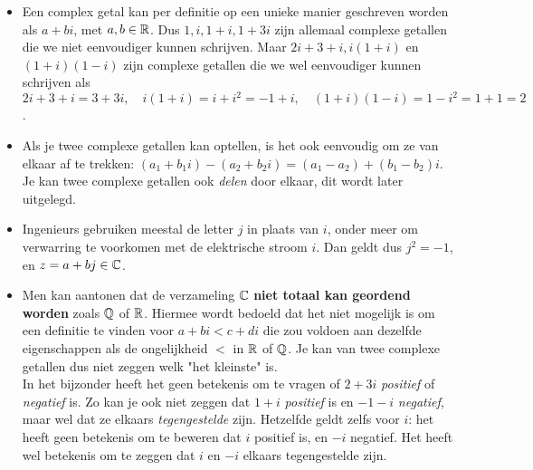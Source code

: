 \documentclass{ximera}
\begin{document}
	\author{Zomercursus KU Leuven}

    
    \begin{remark} \nl
    \begin{itemize}
        \item Een complex getal kan per definitie op een unieke manier geschreven worden als $a+bi$, met $a,b\in\mathbb{R}$. Dus $1, i, 1+i, 1+3i$ zijn allemaal complexe getallen die we niet eenvoudiger kunnen schrijven. Maar $2i+3+i, i(1+i)$ en $(1+i)(1-i)$ zijn complexe getallen die we wel eenvoudiger kunnen schrijven als $2i+3+i=3+3i, \quad i(1+i)=i+i^2 =-1+i,\quad  (1+i)(1-i) = 1 - i^2 = 1+1 =2$.
        
        \item Als je twee complexe getallen kan optellen, is het ook eenvoudig om ze van elkaar af te trekken: $(a_1+b_1i)-(a_2+b_2i) = (a_1-a_2)+(b_1-b_2)i$. Je kan twee complexe getallen ook \textit{delen} door elkaar, dit wordt later uitgelegd.
        
        \item Ingenieurs gebruiken meestal de letter $j$ in plaats van $i$, onder meer om verwarring te voorkomen met de elektrische stroom $i$. Dan geldt dus $j^2=-1$, en $z=a+bj\in\mathbb{C}$.
        
        \item 
        Men kan aantonen dat de verzameling $\mathbb{C}$ \textbf{niet totaal kan geordend worden} zoals $\mathbb{Q}$ of $\mathbb{R}$. Hiermee wordt bedoeld dat het niet mogelijk is om een definitie te vinden voor $a+bi <c+di$ die zou voldoen aan dezelfde eigenschappen als de ongelijkheid $<$ in $\mathbb{R}$ of $\mathbb{Q}$. Je kan van twee complexe getallen dus niet zeggen welk "{}het kleinste{}" is.
        \\ 
        In het bijzonder heeft het geen betekenis om te vragen of $2+3i$ \textit{positief} of \textit{negatief} is. 
        Zo kan je ook niet zeggen dat $1+i$ \textit{positief} is en $-1-i$ \textit{ negatief}, maar wel dat ze elkaars \textit{tegengestelde} zijn. Hetzelfde geldt zelfs voor $i$: het heeft geen betekenis om te beweren dat $i$ positief is, en $-i$ negatief. Het heeft wel betekenis om te zeggen dat $i$ en $-i$ elkaars tegengestelde zijn.
        
    \end{itemize}
    \end{remark}
    
\end{document}
